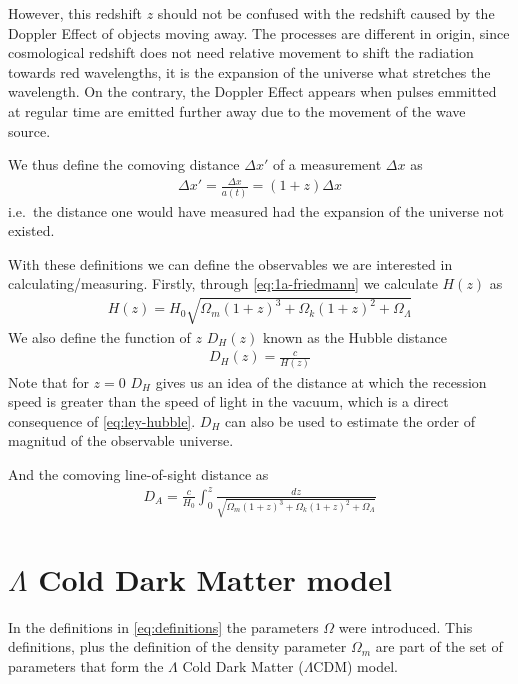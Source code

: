 However, this redshift $z$ should not be confused with the redshift caused by the Doppler Effect of objects moving away. The processes are different in origin, since cosmological redshift does not need relative movement to shift the radiation towards red wavelengths, it is the expansion of the universe what stretches the wavelength. On the contrary, the Doppler Effect appears when pulses emmitted at regular time are emitted further away due to the movement of the wave source.

We thus define the comoving distance $\Delta x'$ of a measurement $\Delta x$ as 
\begin{align}
	\Delta x' =\frac{\Delta x}{a(t)}= (1+z)\Delta x
\end{align}
i.e.\ the distance one would have measured had the expansion of the universe not existed.

With these definitions we can define  the observables we are interested in calculating/measuring. Firstly, through \eqref{eq:1a-friedmann} we calculate $H(z)$ as  
\begin{align}
	H(z) = H_0 \sqrt{\Omega_m(1+z)^3 + \Omega_k(1+z)^2 + \Omega_\Lambda} 
\end{align}
We also define the function of $z$ $D_H(z)$ known as the Hubble distance
\begin{align}
	D_H(z)  = \frac{c}{H(z)}
\end{align}
Note that for $z = 0$ $D_H$ gives us an idea of the distance at which the recession speed is greater than the speed of light in the vacuum, which is a direct consequence of \eqref{eq:ley-hubble}. $D_H$ can also be used to estimate the order of magnitud of the observable universe.

And the comoving line-of-sight distance as 
\begin{align}
	D_A = \frac{c}{H_0}\int_{0}^{z} \frac{dz}{\sqrt{\Omega_m(1+z)^3 + \Omega_k(1+z)^2 + \Omega_\Lambda} } 
\end{align}

\section{$\Lambda$ Cold Dark Matter model}

In the definitions in \eqref{eq:definitions} the parameters $\Omega$ were introduced. This definitions, plus the definition of the density parameter $\Omega_m$ are part of the set of parameters that form the $\Lambda$ Cold Dark Matter ($\Lambda$CDM) model.

